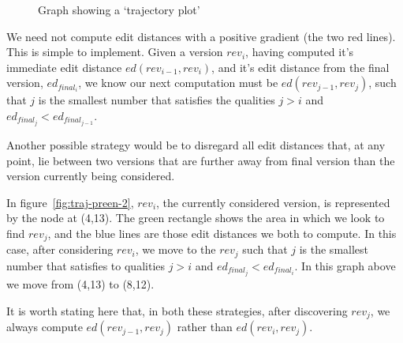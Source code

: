 \begin{wrapfigure}{i}{0.4\textwidth}
  \centering
  \pgfplotsset{width=0.4\textwidth}
  \caption{Graph showing a `trajectory plot'}
  \label{fig:dummy-history}
\end{wrapfigure}

We need not compute edit distances with a positive gradient (the two
red lines). This is simple to implement. Given a version $rev_i$, having
computed it's immediate edit distance $ed(rev_{i-1},rev_i)$, and it's edit
distance from the final version, $ed_{final_i}$, we know our next
computation must be $ed(rev_{j-1},rev_j)$, such that $j$ is the smallest
number that satisfies the qualities $j > i$ and $ed_{final_j} <
ed_{final_{j-1}}$.

Another possible strategy would be to disregard all edit distances
that, at any point, lie between two versions that are further away
from final version than the version currently being considered.

In figure~\ref{fig:traj-preen-2}, $rev_i$, the currently considered
version, is represented by the node at (4,13). The green rectangle
shows the area in which we look to find $rev_j$, and the blue lines
are those edit distances we both to compute. In this case, after
considering $rev_i$, we move to the $rev_j$ such that $j$ is the
smallest number that satisfies to qualities $j > i$ and $ed_{final_j}
< ed_{final_i}$. In this graph above we move from (4,13) to (8,12).

It is worth stating here that, in both these strategies, after
discovering $rev_j$, we always compute $ed(rev_{j-1}, rev_j)$ rather
than $ed(rev_i,rev_j)$. 

